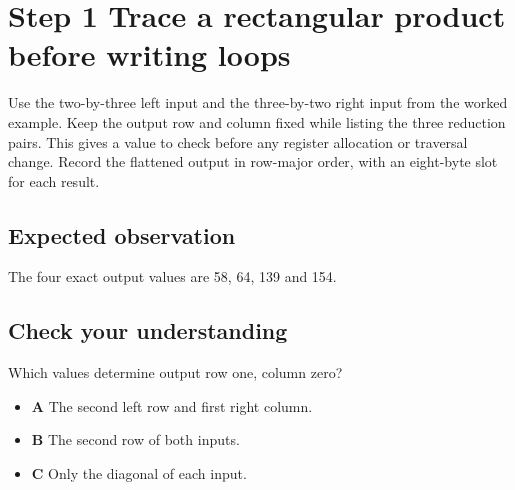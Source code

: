 \section{Step 1 Trace a rectangular product before writing loops}\label{matmul-s01}

Use the two-by-three left input and the three-by-two right input from the worked example. Keep the output row and column fixed while listing the three reduction pairs. This gives a value to check before any register allocation or traversal change. Record the flattened output in row-major order, with an eight-byte slot for each result.

\subsection{Expected observation}
The four exact output values are 58, 64, 139 and 154.

\subsection{Check your understanding}
Which values determine output row one, column zero?

\begin{itemize}
  \item \textbf{A} The second left row and first right column.
  \item \textbf{B} The second row of both inputs.
  \item \textbf{C} Only the diagonal of each input.
\end{itemize}

